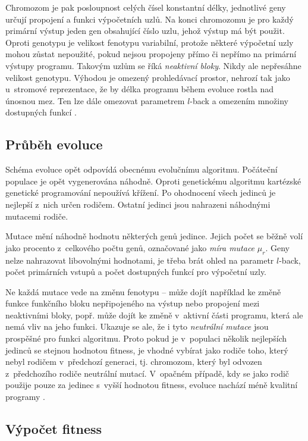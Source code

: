 Chromozom je pak posloupnost celých čísel konstantní délky, jednotlivé geny určují propojení a funkci výpočetních uzlů. Na konci chromozomu je pro každý primární výstup jeden gen obsahující číslo uzlu, jehož výstup má být použit. Oproti genotypu je velikost fenotypu variabilní, protože některé výpočetní uzly mohou zůstat nepoužité, pokud nejsou propojeny přímo či nepřímo na primární výstupy programu. Takovým uzlům se říká \emph{neaktivní bloky}. Nikdy ale nepřesáhne velikost genotypu. Výhodou je omezený prohledávací prostor, nehrozí tak jako u~stromové reprezentace, že by délka programu během evoluce rostla nad únosnou mez. Ten lze dále omezovat parametrem $l$-back a omezením množiny dostupných funkcí \cite{ZelenaCGP, Modra}.


\subsection{Průběh evoluce}

Schéma evoluce opět odpovídá obecnému evolučnímu algoritmu. Počáteční populace je opět vygenerována náhodně. Oproti genetickému algoritmu kartézské genetické programování nepoužívá křížení. Po ohodnocení všech jedinců je nejlepší z~nich určen rodičem. Ostatní jedinci jsou nahrazeni náhodnými mutacemi rodiče.

Mutace mění náhodně hodnotu některých genů jedince. Jejich počet se běžně volí jako procento z~celkového počtu genů, označované jako \emph{míra mutace} $\mu_r$. Geny nelze nahrazovat libovolnými hodnotami, je třeba brát ohled na parametr $l$-back, počet primárních vstupů a počet dostupných funkcí pro výpočetní uzly.

Ne každá mutace vede na změnu fenotypu -- může dojít například ke změně funkce funkčního bloku nepřipojeného na výstup nebo propojení mezi neaktivními bloky, popř. může dojít ke změně v~aktivní části programu, která ale nemá vliv na jeho funkci. Ukazuje se ale, že i tyto \emph{neutrální mutace} jsou prospěšné pro funkci algoritmu. Proto pokud je v~populaci několik nejlepších jedinců se stejnou hodnotou fitness, je vhodné vybírat jako rodiče toho, který nebyl rodičem v~předchozí generaci, tj. chromozom, který byl odvozen z~předchozího rodiče neutrální mutací. V~opačném případě, kdy se jako rodič použije pouze za jedinec s~vyšší hodnotou fitness, evoluce nachází méně kvalitní programy \cite{ZelenaCGP, Modra}.


\subsection{Výpočet fitness}

